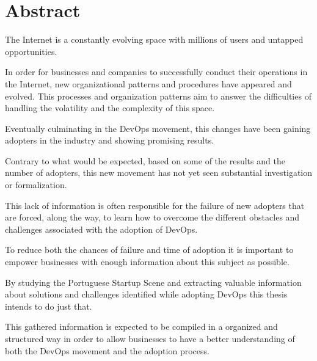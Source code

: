 \chapter*{Abstract}

The Internet is a constantly evolving space with millions of users and untapped opportunities. 

In order for businesses and companies to successfully conduct their operations in the Internet, new organizational patterns and procedures have appeared and evolved. This processes and organization patterns aim to answer the difficulties of handling the volatility and the complexity of this space.

Eventually culminating in the DevOps movement, this changes have been gaining adopters in the industry and showing promising results.

Contrary to what would be expected, based on some of the results and the number of adopters, this new movement has not yet seen substantial investigation or formalization. 

This lack of information is often responsible for the failure of new adopters that are forced, along the way, to learn how to overcome the different obstacles and challenges associated with the adoption of DevOps.

To reduce both the chances of failure and time of adoption it is important to  empower businesses with enough information about this subject as possible.

By studying the Portuguese Startup Scene and extracting valuable information about solutions and challenges identified while adopting DevOps this thesis intends to do just that.

This gathered information is expected to be compiled in a organized and structured way in order to allow businesses to have a better understanding of both the DevOps movement and the adoption process.    